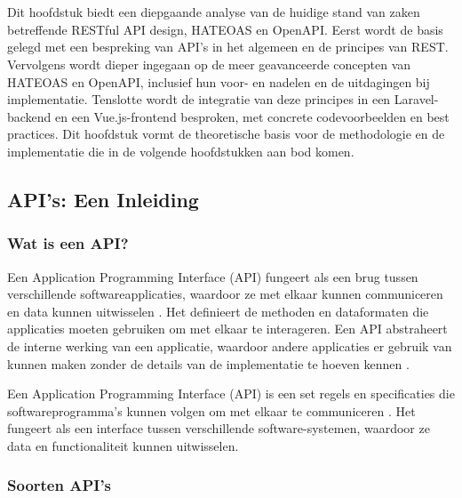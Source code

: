 \chapter{}%
\label{ch:stand-van-zaken}

Dit hoofdstuk biedt een diepgaande analyse van de huidige stand van zaken betreffende RESTful API design, HATEOAS en OpenAPI. Eerst wordt de basis gelegd met een bespreking van API's in het algemeen en de principes van REST. Vervolgens wordt dieper ingegaan op de meer geavanceerde concepten van HATEOAS en OpenAPI, inclusief hun voor- en nadelen en de uitdagingen bij implementatie. Tenslotte wordt de integratie van deze principes in een Laravel-backend en een Vue.js-frontend besproken, met concrete codevoorbeelden en best practices. Dit hoofdstuk vormt de theoretische basis voor de methodologie en de implementatie die in de volgende hoofdstukken aan bod komen.

\section{API's: Een Inleiding}

\subsection{Wat is een API?}

Een Application Programming Interface (API) fungeert als een brug tussen verschillende softwareapplicaties, waardoor ze met elkaar kunnen communiceren en data kunnen uitwisselen \autocite{Goodwin2024}. Het definieert de methoden en dataformaten die applicaties moeten gebruiken om met elkaar te interageren. Een API abstraheert de interne werking van een applicatie, waardoor andere applicaties er gebruik van kunnen maken zonder de details van de implementatie te hoeven kennen \autocite{RedHat2022}.

\bigskip

Een Application Programming Interface (API) is een set regels en specificaties die softwareprogramma's kunnen volgen om met elkaar te communiceren \autocite{Goodwin2024}. Het fungeert als een interface tussen verschillende software-systemen, waardoor ze data en functionaliteit kunnen uitwisselen.

\subsection{Soorten API's}

